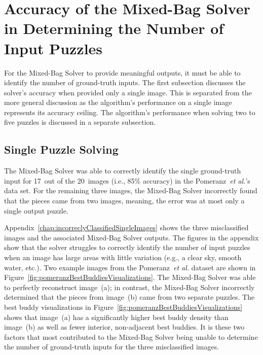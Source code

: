 \section{Accuracy of the Mixed-Bag Solver in Determining the Number of Input Puzzles}

For the Mixed-Bag Solver to provide meaningful outputs, it must be able to identify the number of ground-truth inputs.  The first subsection discusses the solver's accuracy when provided only a single image.  This is separated from the more general discussion as the algorithm's performance on a single image represents its accuracy ceiling.  The algorithm's performance when solving two to five puzzles is discussed in a separate subsection.

\subsection{Single Puzzle Solving}\label{sec:singlePuzzleSolving}

The Mixed-Bag Solver was able to correctly identify the single ground-truth input for 17~out of the 20~images (i.e., 85\% accuracy) in the Pomeranz~\textit{et al.}'s data set.  For the remaining three images, the Mixed-Bag Solver incorrectly found that the pieces came from two images, meaning, the error was at most only a single output puzzle. 

Appendix~\ref{chap:incorreclyClassifiedSingleImages} shows the three misclassified images and the associated Mixed-Bag Solver outputs. The figures in the appendix show that the solver struggles to correctly identify the number of input puzzles when an image has large areas with little variation (e.g., a clear sky, smooth water, etc.). Two example images from the Pomeranz~\textit{et al.} dataset are shown in Figure~\ref{fig:pomeranzBestBuddiesVisualizations}.  The Mixed-Bag Solver was able to perfectly reconstruct image~(a); in contrast, the Mixed-Bag Solver incorrectly determined that the pieces from image~(b) came from two separate puzzles. The best buddy visualizations in Figure~\ref{fig:pomeranzBestBuddiesVisualizations} shows that image~(a) has a significantly higher best buddy density than image~(b) as well as fewer interior, non-adjacent best buddies.  It is these two factors that most contributed to the Mixed-Bag Solver being unable to determine the number of ground-truth inputs for the three misclassified images. 

